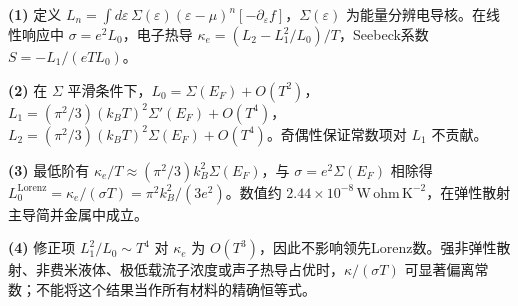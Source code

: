 \par\noindent\textbf{(1)} 定义 \(L_n=\int d\varepsilon\,\Sigma(\varepsilon)(\varepsilon-\mu)^n[-\partial_\varepsilon f]\)，\(\Sigma(\varepsilon)\) 为能量分辨电导核。在线性响应中 \(\sigma=e^2L_0\)，电子热导 \(\kappa_e=(L_2-L_1^2/L_0)/T\)，Seebeck系数 \(S=-L_1/(eTL_0)\)。
\par\noindent\textbf{(2)} 在 \(\Sigma\) 平滑条件下，\(L_0=\Sigma(E_F)+O(T^2)\)，\(L_1=(\pi^2/3)(k_BT)^2\Sigma'(E_F)+O(T^4)\)，\(L_2=(\pi^2/3)(k_BT)^2\Sigma(E_F)+O(T^4)\)。奇偶性保证常数项对 \(L_1\) 不贡献。
\par\noindent\textbf{(3)} 最低阶有 \(\kappa_e/T\approx(\pi^2/3)k_B^2\Sigma(E_F)\)，与 \(\sigma=e^2\Sigma(E_F)\) 相除得 \(L_0^{\mathrm{Lorenz}}=\kappa_e/(\sigma T)=\pi^2k_B^2/(3e^2)\)。数值约 \(2.44\times10^{-8}\,\mathrm{W\,\mathrm{ohm}\,K^{-2}}\)，在弹性散射主导简并金属中成立。
\par\noindent\textbf{(4)} 修正项 \(L_1^2/L_0\sim T^4\) 对 \(\kappa_e\) 为 \(O(T^3)\)，因此不影响领先Lorenz数。强非弹性散射、非费米液体、极低载流子浓度或声子热导占优时，\(\kappa/(\sigma T)\) 可显著偏离常数；不能将这个结果当作所有材料的精确恒等式。
